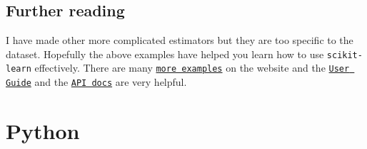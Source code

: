 \documentclass[11pt]{article}
\theoremstyle{definition}
\newcommand{\myhref}[2]{\href{#1}{\texttt{#2}}}
\begin{document}
\subsection{Further reading}
I have made other more complicated estimators but they are too specific to the dataset. Hopefully the above examples have helped you learn how to use \texttt{scikit-learn} effectively. There are many \myhref{https://scikit-learn.org/stable/auto_examples/index.html}{more examples} on the website and the \myhref{https://scikit-learn.org/stable/user_guide.html}{User Guide} and the \myhref{https://scikit-learn.org/stable/modules/classes.html}{API docs} are very helpful. \section{Python}
\end{document}
